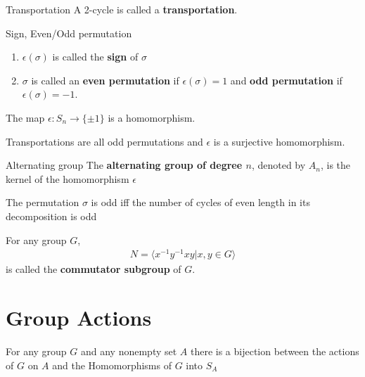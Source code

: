 \documentclass[titlepage, 12pt]{book}
\begin{document}
\begin{definition}{Transportation}{}
    A 2-cycle is called a \textbf{transportation}.
\end{definition}
\begin{definition}{Sign, Even/Odd permutation}{}
    \begin{enumerate}
        \item $\epsilon(\sigma)$ is called the \textbf{sign} of $\sigma$
        \item $\sigma$ is called an \textbf{even permutation} if
            $\epsilon(\sigma) = 1$ and \textbf{odd permutation} if
            $\epsilon(\sigma) = -1$.
    \end{enumerate}
\end{definition}
\begin{proposition}{}{}
    The map $\epsilon:S_n\rightarrow\{\pm 1\}$ is a homomorphism.
\end{proposition}
\begin{proposition}{}{}
    Transportations are all odd permutations and $\epsilon$ is a surjective
    homomorphism.
\end{proposition}
\begin{definition}{Alternating group}{}
    The \textbf{alternating group of degree $n$}, denoted by $A_n$, is the
    kernel of the homomorphism $\epsilon$
\end{definition}
\begin{proposition}{}{}
    The permutation $\sigma$ is odd iff the number of cycles of even length in
    its decomposition is odd
\end{proposition}
\begin{definition}{}{}
    For any group $G$,
    \begin{gather*}
        N = \langle x^{-1}y^{-1}xy | x, y\in G\rangle
    \end{gather*}
    is called the \textbf{commutator subgroup} of $G$.
\end{definition}

\chapter{Group Actions}

\begin{proposition}{}{}
    For any group $G$ and any nonempty set $A$ there is a bijection between the
    actions of $G$ on $A$ and the Homomorphisms of $G$ into $S_A$
\end{proposition}
\end{document}
